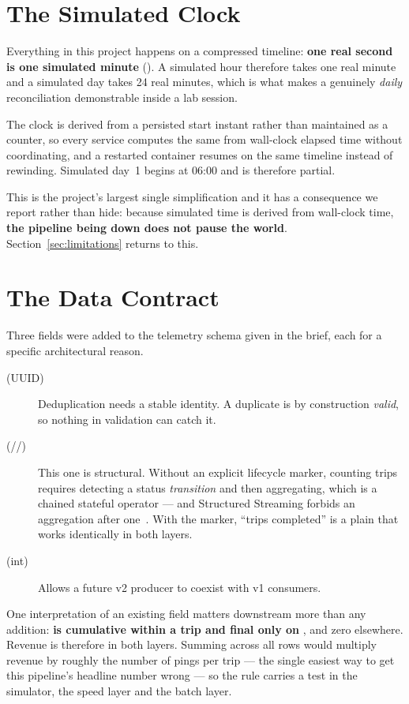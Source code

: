 \section{The Simulated Clock}
\label{sec:simclock}

Everything in this project happens on a compressed timeline:
\textbf{one real second is one simulated minute} ().
A simulated hour therefore takes one real minute and a simulated day
takes 24 real minutes, which is what makes a genuinely \emph{daily}
reconciliation demonstrable inside a lab session.

The clock is derived from a persisted start instant rather than
maintained as a counter, so every service computes the same
 from wall-clock elapsed time without coordinating, and a
restarted container resumes on the same timeline instead of rewinding.
Simulated day~1 begins at 06:00 and is therefore partial.

This is the project's largest single simplification and it has a
consequence we report rather than hide: because simulated time is derived
from wall-clock time, \textbf{the pipeline being down does not pause the
world}. Section~\ref{sec:limitations} returns to this.

\section{The Data Contract}
\label{sec:contract}

Three fields were added to the telemetry schema given in the brief, each
for a specific architectural reason.

\begin{description}
  \item[ (UUID)] Deduplication needs a stable identity.
        A duplicate is by construction \emph{valid}, so nothing in
        validation can catch it.
  \item[ (//)]
        This one is structural. Without an explicit lifecycle marker,
        counting trips requires detecting a status \emph{transition} and
        then aggregating, which is a chained stateful operator ---
        and Structured Streaming forbids an aggregation after
        one~\cite{spark_ss_guide}. With the marker, ``trips completed''
        is a plain  that works
        identically in both layers.
  \item[ (int)] Allows a future v2 producer to
        coexist with v1 consumers.
\end{description}

One interpretation of an existing field matters downstream more than any
addition: \textbf{ is cumulative within a trip and final only
on }, and zero elsewhere. Revenue is therefore
 in both layers. Summing
 across all rows would multiply revenue by roughly the number
of pings per trip --- the single easiest way to get this pipeline's
headline number wrong --- so the rule carries a test in the simulator, the
speed layer and the batch layer.
